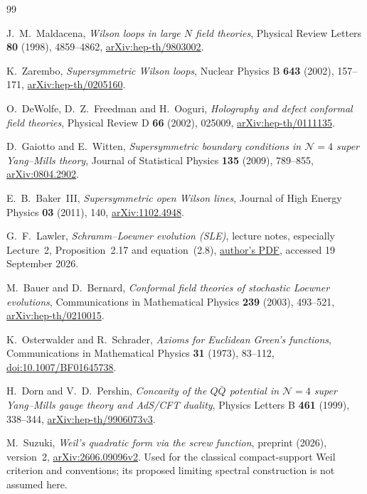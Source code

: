 \begin{thebibliography}{99}
\raggedright

J.~M.~Maldacena, \emph{Wilson loops in large $N$ field theories},
Physical Review Letters \textbf{80} (1998), 4859--4862,
\href{https://arxiv.org/abs/hep-th/9803002}{arXiv:hep-th/9803002}.

K.~Zarembo, \emph{Supersymmetric Wilson loops},
Nuclear Physics B \textbf{643} (2002), 157--171,
\href{https://arxiv.org/abs/hep-th/0205160}{arXiv:hep-th/0205160}.

O.~DeWolfe, D.~Z.~Freedman and H.~Ooguri,
\emph{Holography and defect conformal field theories},
Physical Review D \textbf{66} (2002), 025009,
\href{https://arxiv.org/abs/hep-th/0111135}{arXiv:hep-th/0111135}.

D.~Gaiotto and E.~Witten,
\emph{Supersymmetric boundary conditions in $\mathcal N=4$ super
Yang--Mills theory}, Journal of Statistical Physics \textbf{135}
(2009), 789--855,
\href{https://arxiv.org/abs/0804.2902}{arXiv:0804.2902}.

E.~B.~Baker~III, \emph{Supersymmetric open Wilson lines},
Journal of High Energy Physics \textbf{03} (2011), 140,
\href{https://arxiv.org/abs/1102.4948}{arXiv:1102.4948}.

G.~F.~Lawler, \emph{Schramm--Loewner evolution (SLE)}, lecture notes,
especially Lecture~2, Proposition~2.17 and equation~(2.8),
\href{https://math.uchicago.edu/~lawler/utah.pdf}{author's PDF},
accessed 19 September 2026.

M.~Bauer and D.~Bernard,
\emph{Conformal field theories of stochastic Loewner evolutions},
Communications in Mathematical Physics \textbf{239} (2003), 493--521,
\href{https://arxiv.org/abs/hep-th/0210015}{arXiv:hep-th/0210015}.

K.~Osterwalder and R.~Schrader,
\emph{Axioms for Euclidean Green's functions},
Communications in Mathematical Physics \textbf{31} (1973), 83--112,
\href{https://doi.org/10.1007/BF01645738}{doi:10.1007/BF01645738}.

H.~Dorn and V.~D.~Pershin,
\emph{Concavity of the $Q\bar Q$ potential in $\mathcal N=4$ super
Yang--Mills gauge theory and AdS/CFT duality},
Physics Letters B \textbf{461} (1999), 338--344,
\href{https://arxiv.org/abs/hep-th/9906073v3}{arXiv:hep-th/9906073v3}.

M.~Suzuki, \emph{Weil's quadratic form via the screw function},
preprint (2026), version~2,
\href{https://arxiv.org/abs/2606.09096v2}{arXiv:2606.09096v2}.
Used for the classical compact-support Weil criterion and conventions;
its proposed limiting spectral construction is not assumed here.


\end{thebibliography}
